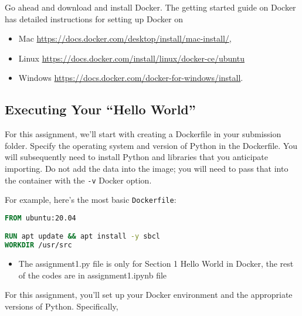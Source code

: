 \documentclass[paper=a4, fontsize=11pt]{scrartcl} %
\begin{document}
Go ahead and download and install Docker. The getting started guide on Docker has detailed instructions for setting up Docker on 
\begin{itemize}
    \item Mac \url{https://docs.docker.com/desktop/install/mac-install/},
    \item Linux \url{https://docs.docker.com/install/linux/docker-ce/ubuntu}
    \item Windows \url{https://docs.docker.com/docker-for-windows/install}.
\end{itemize}

\subsection{Executing Your ``Hello World''}

For this assignment, we'll start with creating a Dockerfile in your submission folder. Specify the operating system and version of Python in the Dockerfile. You will subsequently need to install Python and libraries that you anticipate importing. Do not add the data into the image; you will need to pass that into the container with the \verb"-v" Docker option.


For example, here's the most basic \verb"Dockerfile":

\begin{lstlisting}[language=Dockerfile]
FROM ubuntu:20.04

RUN apt update && apt install -y sbcl
WORKDIR /usr/src
\end{lstlisting}

\begin{itemize}
\color{red}
    \item The assignment1.py file is only for Section 1 Hello World in Docker, the rest of the codes are in assignment1.ipynb file
\end{itemize}

For this assignment, you'll set up your Docker environment and the appropriate versions of Python. Specifically,
\end{document}
